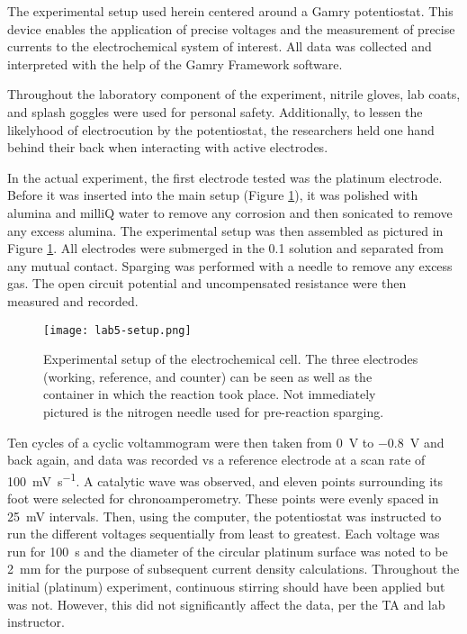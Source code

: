 \documentclass[../labs.tex]{subfiles}
\begin{document}
The experimental setup used herein centered around a Gamry potentiostat. This device enables the application of precise voltages and the measurement of precise currents to the electrochemical system of interest. All data was collected and interpreted with the help of the Gamry Framework software.\par
Throughout the laboratory component of the experiment, nitrile gloves, lab coats, and splash goggles were used for personal safety. Additionally, to lessen the likelyhood of electrocution by the potentiostat, the researchers held one hand behind their back when interacting with active electrodes.\par
In the actual experiment, the first electrode tested was the platinum electrode. Before it was inserted into the main setup (Figure \ref{fig:setup}), it was polished with alumina and milliQ water to remove any corrosion and then sonicated to remove any excess alumina. The experimental setup was then assembled as pictured in Figure \ref{fig:setup}. All electrodes were submerged in the \SI{0.1}{\molar}  solution and separated from any mutual contact. Sparging was performed with a  needle to remove any excess gas. The open circuit potential and uncompensated resistance were then measured and recorded.\par
\begin{figure}[h!]
    \centering
    \texttt{[image: lab5-setup.png]}
    \caption{Experimental setup of the electrochemical cell. The three electrodes (working, reference, and counter) can be seen as well as the container in which the reaction took place. Not immediately pictured is the nitrogen needle used for pre-reaction sparging.}
    \label{fig:setup}
\end{figure}
Ten cycles of a cyclic voltammogram were then taken from \SI{0}{\volt} to \SI{-0.8}{\volt} and back again, and data was recorded vs a  reference electrode at a scan rate of \SI[per-mode=symbol]{100}{\milli\volt\per\second}. A catalytic wave was observed, and eleven points surrounding its foot were selected for chronoamperometry. These points were evenly spaced in \SI{25}{\milli\volt} intervals. Then, using the computer, the potentiostat was instructed to run the different voltages sequentially from least to greatest. Each voltage was run for \SI{100}{\second} and the diameter of the circular platinum surface was noted to be \SI{2}{\milli\meter} for the purpose of subsequent current density calculations. Throughout the initial (platinum) experiment, continuous stirring should have been applied but was not. However, this did not significantly affect the data, per the TA and lab instructor.\par
\end{document}
